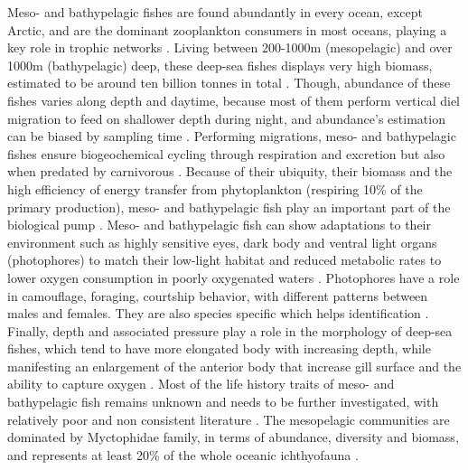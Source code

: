 Meso- and bathypelagic fishes are found abundantly in every ocean, except Arctic, and are the dominant zooplankton consumers in most oceans, playing a key role in trophic networks \citep{davison2015,salvanes2009}. Living between 200-1000m (mesopelagic) and over 1000m (bathypelagic) deep, these deep-sea fishes displays very high biomass, estimated to be around ten billion tonnes in total \citep{garcia2021,gjoesaeter1980,richards2019}. Though, abundance of these fishes varies along depth and daytime, because most of them perform vertical diel migration to feed on shallower depth during night, and abundance's estimation can be biased by sampling time \citep{catul2011,gaskett2001,garcia2021,pusch2004,salvanes2009}. Performing migrations, meso- and bathypelagic fishes ensure biogeochemical cycling through respiration and excretion but also when predated by carnivorous \citep{garcia2021,spitz2019}. Because of their ubiquity, their biomass and the high efficiency of energy transfer from phytoplankton (respiring 10\% of the primary production), meso- and bathypelagic fish play an important part of the biological pump \citep{garcia2021,spitz2019}.
Meso- and bathypelagic fish can show adaptations to their environment such as highly sensitive eyes, dark body and ventral light organs (photophores) to match their low-light habitat and reduced metabolic rates to lower oxygen consumption in poorly oxygenated waters \citep{salvanes2009,farre2016}. Photophores have a role in camouflage, foraging, courtship behavior, with different patterns between males and females. They are also species specific which helps identification \citep{paitio2020,salvanes2009}. Finally, depth and associated pressure play a role in the morphology of deep-sea fishes, which tend to have more elongated body with increasing depth, while manifesting an enlargement of the anterior body that increase gill surface and the ability to capture oxygen \citep{farre2016}. Most of the life history traits of meso- and bathypelagic fish remains unknown and needs to be further investigated, with relatively poor and non consistent literature \citep{childress1980,salvanes2009}. The mesopelagic communities are dominated by Myctophidae family, in terms of abundance, diversity and biomass, and represents at least 20\% of the whole oceanic ichthyofauna \citep{catul2011,kozlov1995,pusch2004}.

